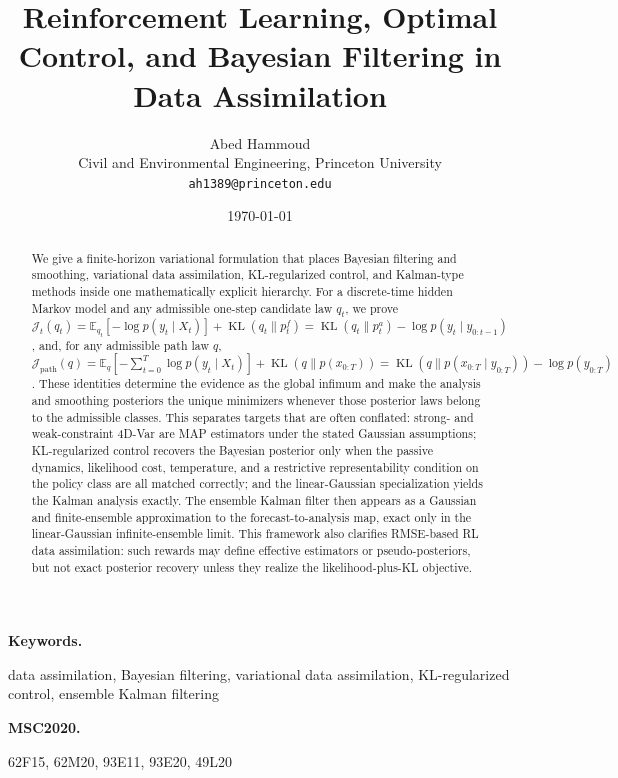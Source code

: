 \documentclass[11pt]{article}
\title{Reinforcement Learning, Optimal Control, and Bayesian Filtering in Data Assimilation}
\author{Abed Hammoud\\
Civil and Environmental Engineering, Princeton University\\
\texttt{ah1389@princeton.edu}}
\date{\today}
\newcommand{\KL}{\operatorname{KL}}
\newcommand{\xtraj}{x_{0:T}}
\newcommand{\ytraj}{y_{0:T}}
\numberwithin{equation}{section}
\theoremstyle{plain}
\theoremstyle{definition}
\theoremstyle{remark}
\newenvironment{keywords}{%
  \par\smallskip\noindent\textbf{Keywords. }%
}{\par\smallskip}
\newenvironment{MSCcodes}{%
  \par\smallskip\noindent\textbf{MSC2020. }%
}{\par\smallskip}
\begin{document}
\maketitle

\begin{abstract}
We give a finite-horizon variational formulation that places Bayesian filtering and smoothing, variational data assimilation, KL-regularized control, and Kalman-type methods inside one mathematically explicit hierarchy. For a discrete-time hidden Markov model and any admissible one-step candidate law $q_t$, we prove $\mathcal J_t(q_t)=\mathbb E_{q_t}\!\left[-\log p(y_t\mid X_t)\right]+\KL(q_t\|p_t^f)=\KL(q_t\|p_t^a)-\log p(y_t\mid y_{0:t-1})$, and, for any admissible path law $q$, $\mathcal J_{\mathrm{path}}(q)=\mathbb E_q\!\left[-\sum_{t=0}^{T}\log p(y_t\mid X_t)\right]+\KL(q\|p(\xtraj))=\KL(q\|p(\xtraj\mid \ytraj))-\log p(\ytraj)$. These identities determine the evidence as the global infimum and make the analysis and smoothing posteriors the unique minimizers whenever those posterior laws belong to the admissible classes. This separates targets that are often conflated: strong- and weak-constraint 4D-Var are MAP estimators under the stated Gaussian assumptions; KL-regularized control recovers the Bayesian posterior only when the passive dynamics, likelihood cost, temperature, and a restrictive representability condition on the policy class are all matched correctly; and the linear-Gaussian specialization yields the Kalman analysis exactly. The ensemble Kalman filter then appears as a Gaussian and finite-ensemble approximation to the forecast-to-analysis map, exact only in the linear-Gaussian infinite-ensemble limit. This framework also clarifies RMSE-based RL data assimilation: such rewards may define effective estimators or pseudo-posteriors, but not exact posterior recovery unless they realize the likelihood-plus-KL objective. 
\end{abstract}

\begin{keywords}
data assimilation, Bayesian filtering, variational data assimilation, KL-regularized control, ensemble Kalman filtering
\end{keywords}

\begin{MSCcodes}
62F15, 62M20, 93E11, 93E20, 49L20
\end{MSCcodes}
\end{document}

